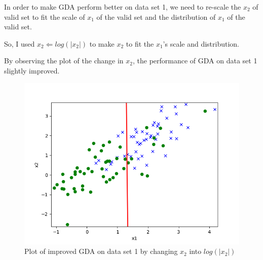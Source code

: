 \begin{answer}
	In order to make GDA perform better on data set 1, we need to re-scale the $x_2$ of valid set to fit the scale of $x_1$ of the valid set and the distribution of $x_1$ of the valid set.
	
	So, I used $x_2 \Leftarrow log(|x_2|)$ to make $x_2$ to fit the $x_1$'s scale and distribution. 
	
	By observing the plot of the change in $x_2$, the performance of GDA on data set 1 slightly improved. 
    \begin{figure}[h]
        \centering
        \includegraphics[width=1.0\linewidth]{tex/linearclass/improved_gda_pred_1.png}
        \caption{Plot of improved GDA on data set 1 by changing $x_2$ into $log(|x_2|)$}
        \label{fig:my_label}
    \end{figure}
	
	
\end{answer}
